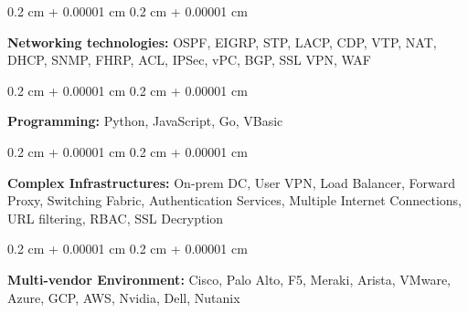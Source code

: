 \documentclass[10pt, a4paper]{article}
\newenvironment{onecolentry}{
    \begin{adjustwidth}{
        0.2 cm + 0.00001 cm
    }{
        0.2 cm + 0.00001 cm
    }
}{
    \end{adjustwidth}
} %
\begin{document}
        \vspace{0.2 cm}

        \begin{onecolentry}
            \textbf{Networking technologies:} OSPF, EIGRP, STP, LACP, CDP, VTP, NAT, DHCP, SNMP, FHRP, ACL, IPSec, vPC, BGP, SSL VPN, WAF
        \end{onecolentry}

        \vspace{0.2 cm}

        \begin{onecolentry}
            \textbf{Programming:} Python, JavaScript, Go, VBasic
        \end{onecolentry}

        \vspace{0.2 cm}

        \begin{onecolentry}
            \textbf{Complex Infrastructures:} On-prem DC, User VPN, Load Balancer, Forward Proxy, Switching Fabric, Authentication Services, Multiple Internet Connections, URL filtering, RBAC, SSL Decryption
        \end{onecolentry}

        \vspace{0.2 cm}

        \begin{onecolentry}
            \textbf{Multi-vendor Environment:} Cisco, Palo Alto, F5, Meraki, Arista, VMware, Azure, GCP, AWS, Nvidia, Dell, Nutanix
        \end{onecolentry}


    
\end{document}
